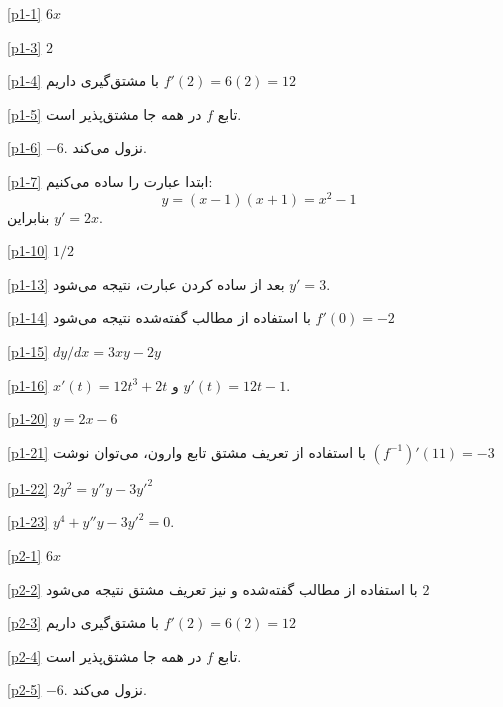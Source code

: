 \paragraphfootnotes

\begin{psolutions}
\item[\ref{p1-1}]
$6x$
\item[\ref{p1-3}]
$2$
\item[\ref{p1-4}]
با مشتق‌گیری داریم
$f'(2)=6(2)=12$
\item[\ref{p1-5}]
تابع $f$ در همه جا مشتق‌پذیر است.
\item[\ref{p1-6}]
$-6$. نزول می‌کند.
\item[\ref{p1-7}]
ابتدا عبارت را ساده می‌کنیم:
\[y=(x-1)(x+1)=x^2 -1\]
بنابراین $y'=2x$.
\item[\ref{p1-10}]
$1/2$
\item[\ref{p1-13}]
بعد از ساده کردن عبارت، نتیجه می‌شود
$y'=3$.
\item[\ref{p1-14}]
با استفاده از مطالب گفته‌شده نتیجه می‌شود 
$f'(0)=-2$
\item[\ref{p1-15}]
$dy/dx=3xy-2y$
\item[\ref{p1-16}]
$x'(t)=12t^3+2t$ و $y'(t)=12t-1$.
\item[\ref{p1-20}]
$y=2x-6$
\item[\ref{p1-21}]
با استفاده از تعریف مشتق تابع وارون، می‌توان نوشت
$(f^{-1})'(11)=-3$
\item[\ref{p1-22}]
$2y^2=y''y-3y'^2$
\item[\ref{p1-23}]
$y^4+y'' y-3y'^2=0$.
\end{psolutions}

\begin{psolutions}
\item[\ref{p2-1}]
$6x$
\item[\ref{p2-2}]
با استفاده از مطالب گفته‌شده و نیز تعریف مشتق نتیجه می‌شود 
$2$
\item[\ref{p2-3}]
با مشتق‌گیری داریم
$f'(2)=6(2)=12$
\item[\ref{p2-4}]
تابع $f$ در همه جا مشتق‌پذیر است.
\item[\ref{p2-5}]
$-6$. نزول می‌کند.
\end{psolutions}